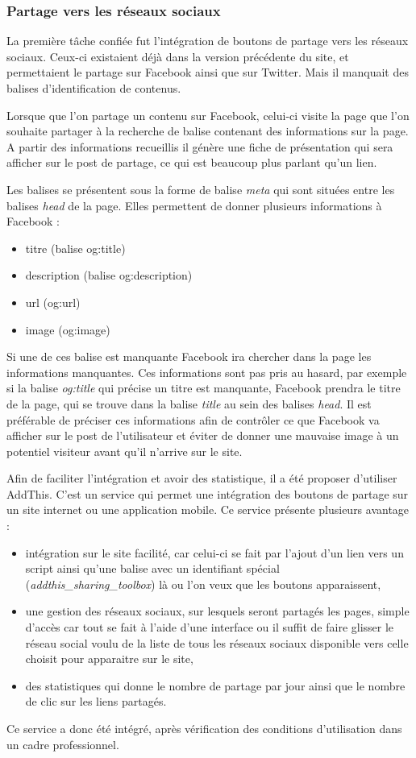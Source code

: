 \documentclass[12pt,a4paper]{article}
\begin{document}
\subsubsection{Partage vers les réseaux sociaux}
La première tâche confiée fut l'intégration de boutons de partage vers les réseaux sociaux. Ceux-ci existaient déjà dans la version précédente du site, et permettaient le partage sur Facebook ainsi que sur Twitter. Mais il manquait des balises d'identification de contenus.\par 
Lorsque que l'on partage un contenu sur Facebook, celui-ci visite la page que l'on souhaite partager à la recherche de balise contenant des informations sur la page. A partir des informations recueillis il génère une fiche de présentation qui sera afficher sur le post de partage, ce qui est beaucoup plus parlant qu'un lien.\par
Les balises se présentent sous la forme de balise \textit{meta} qui sont situées entre les balises \textit{head} de la page. Elles permettent de donner plusieurs informations à Facebook :
\begin{itemize}
\item titre (balise og:title)
\item description (balise og:description)
\item url (og:url)
\item image (og:image)
\end{itemize}
Si une de ces balise est manquante Facebook ira chercher dans la page les informations manquantes. Ces informations sont pas pris au hasard, par exemple si la balise \textit{og:title} qui précise un titre est manquante, Facebook prendra le titre de la page, qui se trouve dans la balise \textit{title} au sein des balises \textit{head}. Il est préférable de préciser ces informations afin de contrôler ce que Facebook va afficher sur le post de l'utilisateur et éviter de donner une mauvaise image à un potentiel visiteur avant qu'il n'arrive sur le site.\par
\bigskip
Afin de faciliter l'intégration et avoir des statistique, il a été proposer d'utiliser AddThis. C'est un service qui permet une intégration des boutons de partage sur un site internet ou une application mobile. Ce service présente plusieurs avantage : 
\begin{itemize}
\item intégration sur le site facilité, car celui-ci se fait par l'ajout d'un lien vers un script ainsi qu'une balise avec un identifiant spécial (\textit{addthis\_sharing\_toolbox}) là ou l'on veux que les boutons apparaissent,
\item une gestion des réseaux sociaux, sur lesquels seront partagés les pages, simple d'accès car tout se fait à l'aide d'une interface ou il suffit de faire glisser le réseau social voulu de la liste de tous les réseaux sociaux disponible vers celle choisit pour apparaitre sur le site,
\item des statistiques qui donne le nombre de partage par jour ainsi que le nombre de clic sur les liens partagés.
\end{itemize}
Ce service a donc été intégré, après vérification des conditions d'utilisation dans un cadre professionnel.\par
\end{document}
